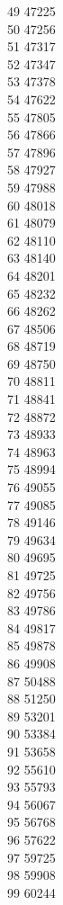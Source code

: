 { 49	47225 \\
 50	47256 \\
 51	47317 \\
 52	47347 \\
 53	47378 \\
 54	47622 \\
 55	47805 \\
 56	47866 \\
 57	47896 \\
 58	47927 \\
 59	47988 \\
 60	48018 \\
 61	48079 \\
 62	48110 \\
 63	48140 \\
 64	48201 \\
 65	48232 \\
 66	48262 \\
 67	48506 \\
 68	48719 \\
 69	48750 \\
 70	48811 \\
 71	48841 \\
 72	48872 \\
 73	48933 \\
 74	48963 \\
 75	48994 \\
 76	49055 \\
 77	49085 \\
 78	49146 \\
 79	49634 \\
 80	49695 \\
 81	49725 \\
 82	49756 \\
 83	49786 \\
 84	49817 \\
 85	49878 \\
 86	49908 \\
 87	50488 \\
 88	51250 \\
 89	53201 \\
 90	53384 \\
 91	53658 \\
 92	55610 \\
 93	55793 \\
 94	56067 \\
 95	56768 \\
 96	57622 \\
 97	59725 \\
 98	59908 \\
 99	60244 \\
}
